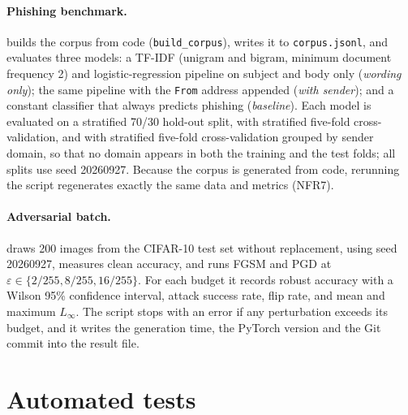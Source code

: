 \paragraph{Phishing benchmark.} %
 builds the corpus from code (\texttt{build\_corpus}), writes it to \texttt{corpus.jsonl}, and evaluates three models: a TF-IDF (unigram and bigram, minimum document frequency 2) and logistic-regression pipeline on subject and body only (\emph{wording only}); the same pipeline with the \texttt{From} address appended (\emph{with sender}); and a constant classifier that always predicts phishing (\emph{baseline}). Each model is evaluated on a stratified 70/30 hold-out split, with stratified five-fold cross-validation, and with stratified five-fold cross-validation grouped by sender domain, so that no domain appears in both the training and the test folds; all splits use seed 20260927. Because the corpus is generated from code, rerunning the script regenerates exactly the same data and metrics (NFR7).

\paragraph{Adversarial batch.} %
 draws 200 images from the CIFAR-10 test set without replacement, using seed 20260927, measures clean accuracy, and runs FGSM and PGD at $\varepsilon \in \{2/255, 8/255, 16/255\}$. For each budget it records robust accuracy with a Wilson 95\% confidence interval, attack success rate, flip rate, and mean and maximum $L_\infty$. The script stops with an error if any perturbation exceeds its budget, and it writes the generation time, the PyTorch version and the Git commit into the result file.

\section{Automated tests}
\label{sec:tests}

